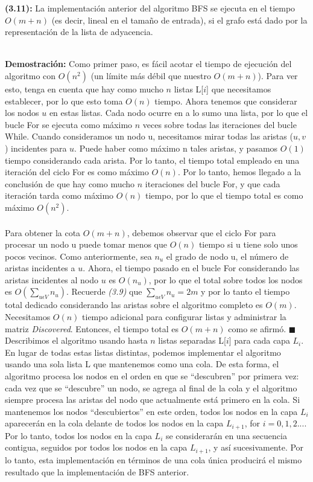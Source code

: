 \documentclass[a4paper, 12pt]{book}
\theoremstyle{dotless}
\begin{document}
\colorbox{mygray}{\parbox{15cm}{
	\textbf{(3.11):} La implementación anterior del algoritmo BFS se ejecuta en el tiempo \(O(m+n)\) (es decir, lineal en el tamaño de entrada), si el grafo está dado por la representación de la lista de adyacencia.}}\\
    
\textbf{Demostración:} Como primer paso, es fácil acotar el tiempo de ejecución del algoritmo con \(O(n^{2})\) (un límite más débil que nuestro \(O(m+n)\)). Para ver esto, tenga en cuenta que hay como mucho $n$ listas L[$i$] que necesitamos establecer, por lo que esto toma \(O(n)\) tiempo. Ahora tenemos que considerar los nodos $u$ en estas listas. Cada nodo ocurre en a lo sumo una lista, por lo que el bucle For se ejecuta como máximo $n$ veces sobre todas las iteraciones del bucle While. Cuando consideramos un nodo u, necesitamos mirar todas las aristas ($u, v$) incidentes para $u$. Puede haber como máximo n tales aristas, y pasamos \(O(1)\) tiempo considerando cada arista. Por lo tanto, el tiempo total empleado en una iteración del ciclo For es como máximo \(O(n)\). Por lo tanto, hemos llegado a la conclusión de que hay como mucho $n$ iteraciones del bucle For, y que cada iteración tarda como máximo \(O(n)\) tiempo, por lo que el tiempo total es como máximo \(O(n^{2})\).
\paragraph{}
Para obtener la cota \(O(m + n)\), debemos observar que el ciclo For para procesar un nodo u puede tomar menos que \(O(n)\) tiempo si u tiene solo unos pocos vecinos. Como anteriormente, sea \(n_{u}\)  el grado de nodo u, el número de aristas incidentes a $u$. Ahora, el tiempo pasado en el bucle For considerando las aristas incidentes al nodo $u$ es \(O(n_{u})\), por lo que el total sobre todos los nodos es \(O(\sum_{u\epsilon V} {n_{u}})\). Recuerde \textit{(3.9)} que \(\sum_{u\epsilon V} {n_{u}} = 2m\) y por lo tanto el tiempo total dedicado considerando las aristas sobre el algoritmo completo es \(O(m)\). Necesitamos \(O(n)\) tiempo adicional para configurar listas y administrar la matriz\textit{ Discovered}. Entonces, el tiempo total es \(O(m+n)\) como se afirmó. $ \blacksquare $ \\

Describimos el algoritmo usando hasta $n$ listas separadas L[$i$] para cada capa \(L_{i}\). En lugar de todas estas listas distintas, podemos implementar el algoritmo usando una sola lista L que mantenemos como una cola. De esta forma, el algoritmo procesa los nodos en el orden en que se ``descubren'' por primera vez: cada vez que se ``descubre'' un nodo,
se agrega al final de la cola y el algoritmo siempre procesa las aristas del nodo que actualmente está primero en la cola.
Si mantenemos los nodos ``descubiertos'' en este orden, todos los nodos en la capa \(L_{i}\) aparecerán en la cola delante de todos los nodos en la capa \(L_{i+1}\), for \(i = 0, 1, 2. . .\). Por lo tanto, todos los nodos en la capa \(L_{i}\) se considerarán en una secuencia contigua, seguidos por todos los nodos en la capa \(L_{i+1}\), y así sucesivamente. Por lo tanto, esta implementación en términos de una cola única producirá el mismo resultado que la implementación de BFS anterior.
\end{document}

